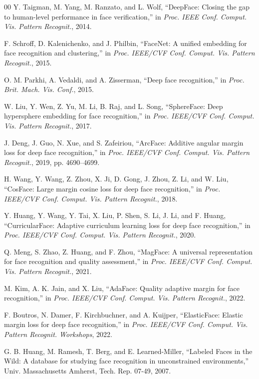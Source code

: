 \documentclass[conference]{IEEEtran}
\begin{document}
\begin{thebibliography}{00}
 Y. Taigman, M. Yang, M. Ranzato, and L. Wolf,
``DeepFace: Closing the gap to human-level performance in face verification,''
in \emph{Proc. IEEE Conf. Comput. Vis. Pattern Recognit.}, 2014.

 F. Schroff, D. Kalenichenko, and J. Philbin, ``FaceNet: A
unified embedding for face recognition and clustering,'' in \emph{Proc.
IEEE/CVF Conf. Comput. Vis. Pattern Recognit.}, 2015.

 O. M. Parkhi, A. Vedaldi, and A. Zisserman, ``Deep face
recognition,'' in \emph{Proc. Brit. Mach. Vis. Conf.}, 2015.

 W. Liu, Y. Wen, Z. Yu, M. Li, B. Raj, and L. Song,
``SphereFace: Deep hypersphere embedding for face recognition,'' in
\emph{Proc. IEEE/CVF Conf. Comput. Vis. Pattern Recognit.}, 2017.

 J. Deng, J. Guo, N. Xue, and S. Zafeiriou, ``ArcFace:
Additive angular margin loss for deep face recognition,'' in \emph{Proc.
IEEE/CVF Conf. Comput. Vis. Pattern Recognit.}, 2019, pp. 4690--4699.

 H. Wang, Y. Wang, Z. Zhou, X. Ji, D. Gong, J. Zhou, Z. Li,
and W. Liu, ``CosFace: Large margin cosine loss for deep face recognition,''
in \emph{Proc. IEEE/CVF Conf. Comput. Vis. Pattern Recognit.}, 2018.

 Y. Huang, Y. Wang, Y. Tai, X. Liu, P. Shen, S. Li,
J. Li, and F. Huang, ``CurricularFace: Adaptive curriculum learning loss for
deep face recognition,'' in \emph{Proc. IEEE/CVF Conf. Comput. Vis. Pattern
Recognit.}, 2020.

 Q. Meng, S. Zhao, Z. Huang, and F. Zhou, ``MagFace: A
universal representation for face recognition and quality assessment,'' in
\emph{Proc. IEEE/CVF Conf. Comput. Vis. Pattern Recognit.}, 2021.

 M. Kim, A. K. Jain, and X. Liu, ``AdaFace: Quality adaptive
margin for face recognition,'' in \emph{Proc. IEEE/CVF Conf. Comput. Vis.
Pattern Recognit.}, 2022.

 F. Boutros, N. Damer, F. Kirchbuchner, and A. Kuijper,
``ElasticFace: Elastic margin loss for deep face recognition,'' in
\emph{Proc. IEEE/CVF Conf. Comput. Vis. Pattern Recognit. Workshops}, 2022.

 G. B. Huang, M. Ramesh, T. Berg, and E. Learned-Miller,
``Labeled Faces in the Wild: A database for studying face recognition in
unconstrained environments,'' Univ. Massachusetts Amherst, Tech. Rep. 07-49,
2007.


\end{thebibliography}
\end{document}
